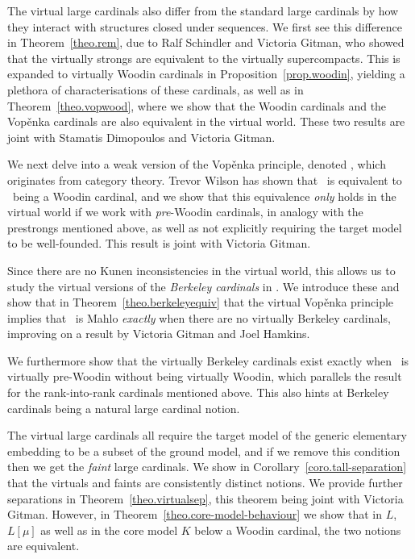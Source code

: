\documentclass[../main]{subfiles}
\begin{document}
\begin{onehalfspacing}
\quad The virtual large cardinals also differ from the standard large cardinals by how they interact with structures closed under sequences. We first see this difference in Theorem~\ref{theo.rem}, due to Ralf Schindler and Victoria Gitman, who showed that the virtually strongs are equivalent to the virtually supercompacts. This is expanded to virtually Woodin cardinals in Proposition~\ref{prop.woodin}, yielding a plethora of characterisations of these cardinals, as well as in Theorem~\ref{theo.vopwood}, where we show that the Woodin cardinals and the Vop\v enka cardinals are also equivalent in the virtual world. These two results are joint with Stamatis Dimopoulos and Victoria Gitman.

\quad We next delve into a weak version of the Vop\v enka principle, denoted \wvp, which originates from category theory. Trevor Wilson has shown that \wvp\ is equivalent to \on\ being a Woodin cardinal, and we show that this equivalence \textit{only} holds in the virtual world if we work with \textit{pre}-Woodin cardinals, in analogy with the prestrongs mentioned above, as well as not explicitly requiring the target model to be well-founded. This result is joint with Victoria Gitman.

\quad Since there are no Kunen inconsistencies in the virtual world, this allows us to study the virtual versions of the \textit{Berkeley cardinals} in \zfc. We introduce these and show that in Theorem~\ref{theo.berkeleyequiv} that the virtual Vop\v enka principle implies that \on\ is Mahlo \textit{exactly} when there are no virtually Berkeley cardinals, improving on a result by Victoria Gitman and Joel Hamkins.

\quad We furthermore show that the virtually Berkeley cardinals exist exactly when \on\ is virtually pre-Woodin without being virtually Woodin, which parallels the result for the rank-into-rank cardinals mentioned above. This also hints at Berkeley cardinals being a natural large cardinal notion.

\quad The virtual large cardinals all require the target model of the generic elementary embedding to be a subset of the ground model, and if we remove this condition then we get the \textit{faint} large cardinals. We show in Corollary~\ref{coro.tall-separation} that the virtuals and faints are consistently distinct notions. We provide further separations in Theorem~\ref{theo.virtualsep}, this theorem being joint with Victoria Gitman. However, in Theorem~\ref{theo.core-model-behaviour} we show that in $L$, $L[\mu]$ as well as in the core model $K$ below a Woodin cardinal, the two notions are equivalent.


\end{onehalfspacing}
\end{document}
